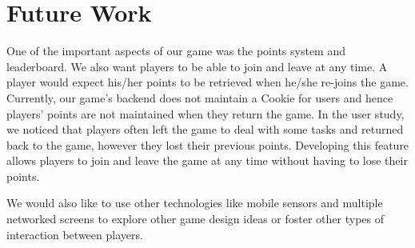 \documentclass{sig-alternate}
\begin{document}
\section{Future Work}
One of the important aspects of our game was the points system and leaderboard. We also want players to be able to join and leave at any time. A player would expect his/her points to be retrieved when 
he/she re-joins the game. 
Currently, our game's backend does not maintain a Cookie for users and hence players' points are not maintained when they return the game. In the user study, we noticed that players often left the game to deal with some tasks and returned back to the game, however they lost their previous points. Developing this feature allows players to join and leave the game at any time without having to lose their points.

We would also like to use other technologies like mobile sensors and multiple networked screens to explore other game design ideas or foster other types of interaction between players.



\end{document}
